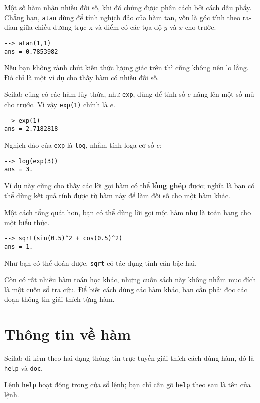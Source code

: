 \documentclass[12pt]{book}
\begin{document}
Một số hàm nhận nhiều đối số, khi đó chúng được phân cách bởi cách
dấu phẩy. Chẳng hạn, {\tt atan} dùng để tính nghịch đảo của hàm tan,
vốn là góc tính theo ra-đian giữa chiều dương trục x và điểm có các
tọa độ $y$ và $x$ cho trước.

\begin{verbatim}
--> atan(1,1)
ans = 0.7853982
\end{verbatim}

Nếu bạn không rành chút kiến thức lượng giác trên thì cũng không nên
lo lắng. Đó chỉ là một ví dụ cho thấy hàm có nhiều đối số.

Scilab cũng có các hàm lũy thừa, như {\tt exp}, dùng để tính số
$e$ nâng lên một số mũ cho trước. Vì vậy {\tt exp(1)} chính là $e$.

\begin{verbatim}
--> exp(1)
ans = 2.7182818
\end{verbatim}

Nghịch đảo của {\tt exp} là {\tt log}, nhằm tính loga cơ số $e$:

\begin{verbatim}
--> log(exp(3))
ans = 3.
\end{verbatim}

Ví dụ này cũng cho thấy các lời gọi hàm có thể {\bf lồng ghép} được;
nghĩa là bạn có thể dùng kết quả tính được từ hàm này để làm đối số
cho một hàm khác.

Một cách tổng quát hơn, bạn có thể dùng lời gọi một hàm như là toán
hạng cho một biểu thức.

\begin{verbatim}
--> sqrt(sin(0.5)^2 + cos(0.5)^2)
ans = 1.
\end{verbatim}

Như bạn có thể đoán được, {\tt sqrt} có tác dụng tính căn bậc hai.

Còn có rất nhiều hàm toán học khác, nhưng cuốn sách này không 
nhằm mục đích là một cuốn sổ tra cứu. Để biết cách dùng các hàm
khác, bạn cần phải đọc các đoạn thông tin giải thích từng hàm.


\section{Thông tin về hàm}

Scilab đi kèm theo hai dạng thông tin trực tuyến giải thích cách dùng hàm, 
đó là {\tt help} và {\tt doc}.

Lệnh \texttt{help} hoạt động trong cửa sổ lệnh; bạn chỉ cần gõ {\tt help}
theo sau là tên của lệnh.
\end{document}
